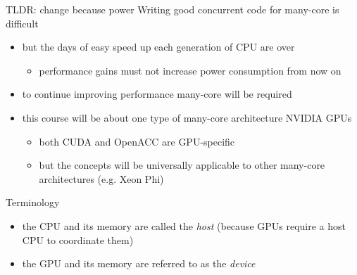 \documentclass[aspectratio=43]{beamer}
\begin{document}
\begin{frame}[fragile]{}
    \begin{info}{TLDR: change because power}
        Writing good concurrent code for many-core is difficult
        \begin{itemize}
            \item but the days of easy speed up each generation of CPU are over
            \begin{itemize}
                \item performance gains must not increase power consumption from now on
            \end{itemize}
            \item to continue improving performance many-core will be required
            \item this course will be about one type of many-core architecture NVIDIA GPUs
            \begin{itemize}
                \item both CUDA and OpenACC are GPU-specific
                \item but the concepts will be universally applicable to other many-core architectures (e.g. Xeon Phi)
            \end{itemize}
        \end{itemize}
    \end{info}
\end{frame}

\begin{frame}[fragile]{}
    \begin{info}{Terminology}
        \begin{itemize}
            \item the CPU and its memory are called the \emph{host} (because GPUs require a host CPU to coordinate them)
            \item the GPU and its memory are referred to as the \emph{device}
        \end{itemize}
    \end{info}
\end{frame}

\end{document}
